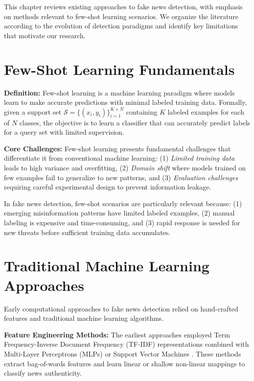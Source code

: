 
This chapter reviews existing approaches to fake news detection, with emphasis on methods relevant to few-shot learning scenarios. We organize the literature according to the evolution of detection paradigms and identify key limitations that motivate our research.

\section{Few-Shot Learning Fundamentals}

\textbf{Definition:} Few-shot learning is a machine learning paradigm where models learn to make accurate predictions with minimal labeled training data. Formally, given a support set $\mathcal{S} = \{(x_i, y_i)\}_{i=1}^{K \times N}$ containing $K$ labeled examples for each of $N$ classes, the objective is to learn a classifier that can accurately predict labels for a query set with limited supervision.

\textbf{Core Challenges:} Few-shot learning presents fundamental challenges that differentiate it from conventional machine learning: (1) \emph{Limited training data} leads to high variance and overfitting, (2) \emph{Domain shift} where models trained on few examples fail to generalize to new patterns, and (3) \emph{Evaluation challenges} requiring careful experimental design to prevent information leakage.

In fake news detection, few-shot scenarios are particularly relevant because: (1) emerging misinformation patterns have limited labeled examples, (2) manual labeling is expensive and time-consuming, and (3) rapid response is needed for new threats before sufficient training data accumulates.

\section{Traditional Machine Learning Approaches}

Early computational approaches to fake news detection relied on hand-crafted features and traditional machine learning algorithms.

\textbf{Feature Engineering Methods:} The earliest approaches employed Term Frequency-Inverse Document Frequency (TF-IDF) representations combined with Multi-Layer Perceptrons (MLPs) or Support Vector Machines \cite{perez2017automatic, wang2017liar}. These methods extract bag-of-words features and learn linear or shallow non-linear mappings to classify news authenticity.

